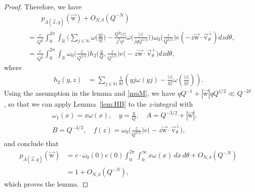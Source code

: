 \documentclass[10pt,a4paper]{amsart}
\newcommand{\N}{\mathbb{N}}
\newcommand{\RR}{\mathbb{R}}
\newcommand{\ua}{\vec{\mathrm{a}}}
\newcommand{\uv}{{\vec{\mathrm{v}}}}
\newcommand{\uw}{{\vec{\mathrm{w}}}}
\begin{document}
\begin{proof}
 Therefore, we have 
	\begin{align*}
		&\quad \quad p_{\Lambda(\ua, q)}(\uw)+O_{N, \delta}(Q^{-N})\\&=\frac{c}{Q^{\frac{3}{2}}}
		\int_{0}^{2\pi}\int_{\RR}\Big(\sum_{j\in\N} \omega\big(\frac{qj}{Q}\big)-\frac{Q^{\frac{1}{2}}|z|}{j^2q^2} \omega\big(\frac{|z|}{jqQ^{1/2}}\big)\Big)
		\omega_0\big(\frac{z}{Q^{3/2}}\big)
		e(-z\uw\cdot \uv_{\theta}^\perp)
		dzd\theta,	
	\\	&=
		\frac{c}{Q^{\frac{3}{2}}}
		\int_{0}^{2\pi}\int_{\RR} 
	\omega_0\big(\frac{z}{Q^{3/2}}\big) 
		h_2\big(
		\frac{q}{Q}
		,
		\frac{z}{Q^{3/2}}
		\big)
		e\big(-z\uw\cdot \uv_{\theta}^\perp\big)
		dzd\theta,
	\end{align*}
	where
	\begin{align*}
		h_2(y,z)
		&=
		\sum_{j\in\N}
		\frac{1}{yj}
		\left(
		{yj}
		\omega\left(yj\right)
		-
		\frac{|z|}{yj}
		\omega\left(\frac{|z|}{yj}\right)
		\right).
	\end{align*}
	Using the assumption in the lemma and \eqref{muM},  we have 
	\(qQ^{-1}+|\uw|qQ^{1/2} \ll Q^{-2\delta}\), so that we can apply Lemma~\ref{lem:HB} to the $z$-integral with
	\begin{align*}
		\omega_1(x)={x\omega(x)},\quad
		y=\frac{q}{Q},\quad
		A=Q^{-3/2}+|\uw|,\quad
		\\B=Q^{-3/2},\quad
		f(z)=\omega_0\Big(\frac{z}{Q^{3/2}}\Big)e\Big(-z\uw\cdot \uv_{\theta}^\perp\Big),
	\end{align*}
	and conclude that
	\begin{equation*}\begin{split}%
		p_{\Lambda(\ua, q)}(\uw)
		&=c \cdot \omega_0(0)e(0)
		\int_{0}^{2\pi} 
		\int_0^\infty x
		\omega(x)\,dx
		\,d\theta+O_{N,\delta}(Q^{-N})
		\\&=1+O_{N,\delta}(Q^{-N}),
        \end{split}
	\end{equation*}
 which proves the lemma.
\end{proof}
\end{document}
